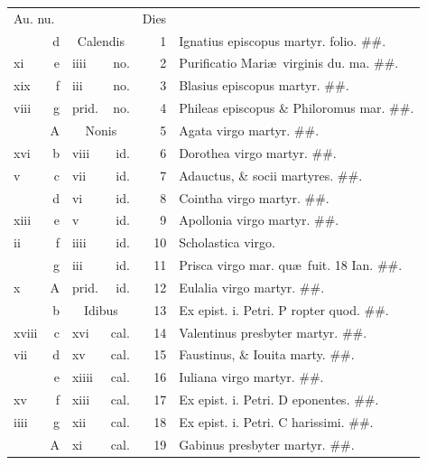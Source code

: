 \documentclass[a5paper,10pt]{book}
\def\ae{æ}
\begin{document}
\begin{center}
\begin{tabular}{l r l r r l}
\multicolumn{2}{l}{\color{red}Au. nu.} & & & \color{red} Dies & \\
 & d & \multicolumn{2}{c}{\color{red} Calendis} & 1 & Ignatius episcopus martyr. folio. \color{black} \#\#.\\
xi & e & iiii & no. & 2 & \color{red} Purificatio Mari\ae \ virginis du. ma. \color{black} \#\#.\\
xix & f & iii & no. & 3 & Blasius episcopus martyr. \color{black} \#\#.\\
viii & g & \color{red} prid. & \color{red} no. & 4 & Phileas episcopus \& Philoromus mar. \color{black} \#\#.\\
 & \color{red} A & \multicolumn{2}{c}{\color{red} Nonis} & 5 & Agata virgo martyr. \color{black} \#\#.\\
xvi & b & viii & id. & 6 & Dorothea virgo martyr. \color{black} \#\#.\\
v & c & vii & id. & 7 & Adauctus, \& socii martyres. \color{black} \#\#.\\
 & d & vi & id. & 8 & Cointha virgo martyr. \color{black} \#\#.\\
xiii & e & v & id. & 9 & Apollonia virgo martyr. \color{black} \#\#.\\
ii & f & iiii & id. & 10 & Scholastica virgo. \\%
 & g & iii & id. & 11 & Prisca virgo mar. qu\ae \ fuit. 18 Ian. \color{black} \#\#.\\
x & \color{red} A & \color{red} prid. & \color{red} id. & 12 & Eulalia virgo martyr. \color{black} \#\#.\\
 & b & \multicolumn{2}{c}{\color{red} Idibus} & 13 & Ex epist. i. Petri. \color{red} P\color{black} ropter quod. \#\#.\\
xviii & c & xvi & cal. & 14 & Valentinus presbyter martyr. \color{black} \#\#.\\
vii & d & xv & cal. & 15 & Faustinus, \& Iouita marty. \color{black} \#\#.\\
 & e & xiiii & cal. & 16 & Iuliana virgo martyr. \color{black} \#\#.\\
xv & f & xiii & cal. & 17 & Ex epist. i. Petri. \color{red} D\color{black} eponentes. \#\#.\\
iiii & g & xii & cal. & 18 & Ex epist. i. Petri. \color{red} C\color{black} harissimi. \#\#.\\
 & \color{red} A & xi & cal. & 19 & Gabinus presbyter martyr. \color{black} \#\#.\\

\end{tabular}
\end{center}
\end{document}
